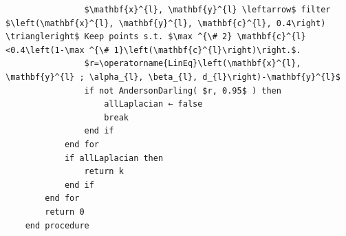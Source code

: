 \documentclass[10pt]{article}
\begin{document}
\begin{verbatim}
                $\mathbf{x}^{l}, \mathbf{y}^{l} \leftarrow$ filter $\left(\mathbf{x}^{l}, \mathbf{y}^{l}, \mathbf{c}^{l}, 0.4\right) \triangleright$ Keep points s.t. $\max ^{\# 2} \mathbf{c}^{l}<0.4\left(1-\max ^{\# 1}\left(\mathbf{c}^{l}\right)\right.$.
                $r=\operatorname{LinEq}\left(\mathbf{x}^{l}, \mathbf{y}^{l} ; \alpha_{l}, \beta_{l}, d_{l}\right)-\mathbf{y}^{l}$
                if not AndersonDarling( $r, 0.95$ ) then
                    allLaplacian ← false
                    break
                end if
            end for
            if allLaplacian then
                return k
            end if
        end for
        return 0
    end procedure
\end{verbatim}
\end{document}
